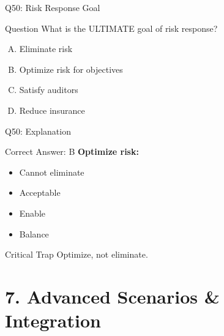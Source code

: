 \documentclass{beamer}
\begin{document}
			\begin{frame}{Q50: Risk Response Goal}
				\begin{block}{Question}
					What is the ULTIMATE goal of risk response?
				\end{block}
				\begin{enumerate}[(A)]
					\item Eliminate risk
					\item Optimize risk for objectives
					\item Satisfy auditors
					\item Reduce insurance
				\end{enumerate}
			\end{frame}
			
			\begin{frame}{Q50: Explanation}
				\begin{block}{Correct Answer: B}
					\textbf{Optimize risk:}
					\begin{itemize}
						\item Cannot eliminate
						\item Acceptable
						\item Enable
						\item Balance
					\end{itemize}
				\end{block}
				\begin{alertblock}{Critical Trap}
					Optimize, not eliminate.
				\end{alertblock}
			\end{frame}
			
			
			\section{7. Advanced Scenarios & Integration}
			
\end{document}
